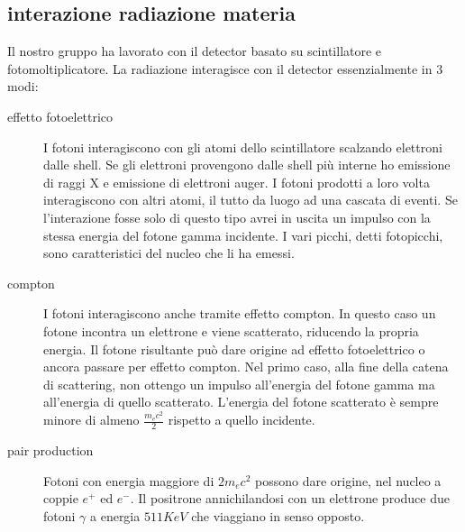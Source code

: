 \documentclass[11pt,a4paper]{article}
\begin{document}
\subsection{interazione radiazione materia}
Il nostro gruppo ha lavorato con il detector basato su scintillatore e fotomoltiplicatore. La radiazione interagisce con il detector essenzialmente in 3 modi:
\begin{description}
  \item[effetto fotoelettrico] I fotoni interagiscono con gli atomi dello scintillatore scalzando elettroni dalle shell. Se gli elettroni provengono dalle shell più interne ho emissione di raggi X e emissione di elettroni auger. I fotoni prodotti a loro volta interagiscono con altri atomi, il tutto da luogo ad una cascata di eventi. Se l'interazione fosse solo di questo tipo avrei in uscita un impulso con la stessa energia del fotone gamma incidente. I vari picchi, detti fotopicchi, sono caratteristici del nucleo che li ha emessi.
  \item[compton] I fotoni interagiscono anche tramite effetto compton. In questo caso un fotone incontra un elettrone e viene scatterato, riducendo la propria energia. Il fotone risultante può dare origine ad effetto fotoelettrico o ancora passare per effetto compton. Nel primo caso, alla fine della catena di scattering, non ottengo un impulso all'energia del fotone gamma ma all'energia di quello scatterato. L'energia del fotone scatterato è sempre minore di almeno $\frac{m_e c^2}{2}$ rispetto a quello incidente.
  \item[pair production] Fotoni con energia maggiore di $2 m_e c^2$ possono dare origine, nel nucleo a coppie $e^+$ ed $e^-$. Il positrone annichilandosi con un elettrone produce due fotoni $\gamma$ a energia $511KeV$ che viaggiano in senso opposto.
\end{description}
\end{document}
